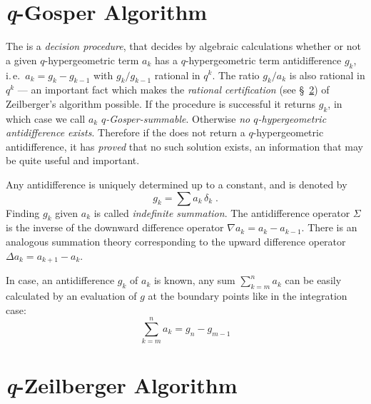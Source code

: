 
\section{\textsl{q}-Gosper Algorithm}
\label{qgosper}

The \qgosperalg \cite{Koornwinder} is a {\sl decision procedure}, that
decides by algebraic calculations whether or not a given 
$q$-hypergeometric term $a_k$ has a $q$-hypergeometric term 
antidifference $g_k$, i.\,e.\ $a_k=g_{k}-g_{k-1}$ with 
$g_{k}/g_{k-1}$ rational in $q^k$. The ratio $g_k/a_k$ is also rational
in $q^k$ --- an important fact which makes the 
\textsl{rational certification} (see \S~\ref{qzeilberger}) of Zeilberger's
algorithm possible. If the procedure is successful
it returns $g_k$, in which case we call $a_k$ 
{\sl $q$-Gosper-summable}. Otherwise
{\sl no $q$-hypergeometric antidifference exists}. Therefore
if the \qgosperalg does not return a $q$-hypergeometric antidifference,
it has {\sl proved} that no such solution exists, an information
that may be quite useful and important. 

Any antidifference is uniquely determined up to a constant, and is
denoted by
\[
g_k=\sum a_k\,\delta_k
\;.
\]
Finding $g_k$ given $a_k$ is called {\sl indefinite summation}.
The antidifference operator $\Sigma$ is the inverse of the downward 
difference operator $\nabla a_k=a_{k}-a_{k-1}$. There is an analogous
summation theory corresponding to the upward difference operator 
$\Delta a_k=a_{k+1}-a_k$.

In case, an antidifference $g_k$ of $a_k$ is known, any sum
$\sum_{k=m}^n{a_k}$ can be easily calculated by an evaluation of 
$g$ at the boundary points like in the integration case:
\[
	\sum_{k=m}^{n}{a_k} = g_{n}-g_{m-1}
\]



\section{\textsl{q}-Zeilberger Algorithm}
\label{qzeilberger}

